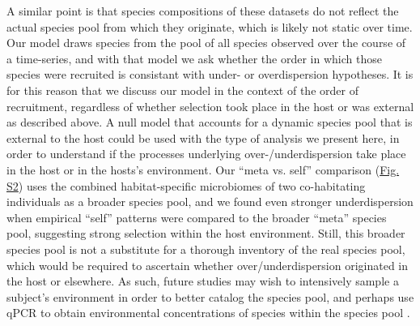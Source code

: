 \documentclass{article}
\begin{document}
\par
A similar point is that species compositions of these datasets do not reflect the actual species pool from which they originate, which is likely not static over time. Our model draws species from the pool of all species observed over the course of a time-series, and with that model we ask whether the order in which those species were recruited is consistant with under- or overdispersion hypotheses. It is for this reason that we discuss our model in the context of the order of recruitment, regardless of whether selection took place in the host or was external as described above. A null model that accounts for a dynamic species pool that is external to the host could be used with the type of analysis we present here, in order to understand if the processes underlying over-/underdispersion take place in the host or in the hosts’s environment. Our “meta vs. self” comparison (\hyperref[sec:figureS2]{Fig. S2}) uses the combined habitat-specific microbiomes of two co-habitating individuals as a broader species pool, and we found even stronger underdispersion when empirical “self” patterns were compared to the broader “meta” species pool, suggesting strong selection within the host environment. Still, this broader species pool is not a substitute for a thorough inventory of the real species pool, which would be required to ascertain whether over/underdispersion originated in the host or elsewhere. As such, future studies may wish to intensively sample a subject’s environment in order to better catalog the species pool, and perhaps use qPCR to obtain environmental concentrations of species within the species pool \cite{Williamson761486}.  
\par
\end{document}
